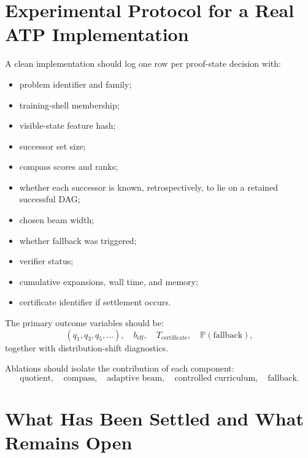 \documentclass[11pt]{article}
\newcommand{\Prob}{\mathbb{P}}
\begin{document}
\section{Experimental Protocol for a Real ATP Implementation}

A clean implementation should log one row per proof-state decision with:
\begin{itemize}
\item problem identifier and family;
\item training-shell membership;
\item visible-state feature hash;
\item successor set size;
\item compass scores and ranks;
\item whether each successor is known, retrospectively, to lie on a retained successful DAG;
\item chosen beam width;
\item whether fallback was triggered;
\item verifier status;
\item cumulative expansions, wall time, and memory;
\item certificate identifier if settlement occurs.
\end{itemize}

The primary outcome variables should be:
\[
(q_1,q_3,q_5,\ldots),\quad
b_{\mathrm{eff}},\quad
T_{\mathrm{certificate}},\quad
\Prob(\mathrm{fallback}),
\]
together with distribution-shift diagnostics.

Ablations should isolate the contribution of each component:
\[
\text{quotient},\quad
\text{compass},\quad
\text{adaptive beam},\quad
\text{controlled curriculum},\quad
\text{fallback}.
\]

\section{What Has Been Settled and What Remains Open}
\end{document}
